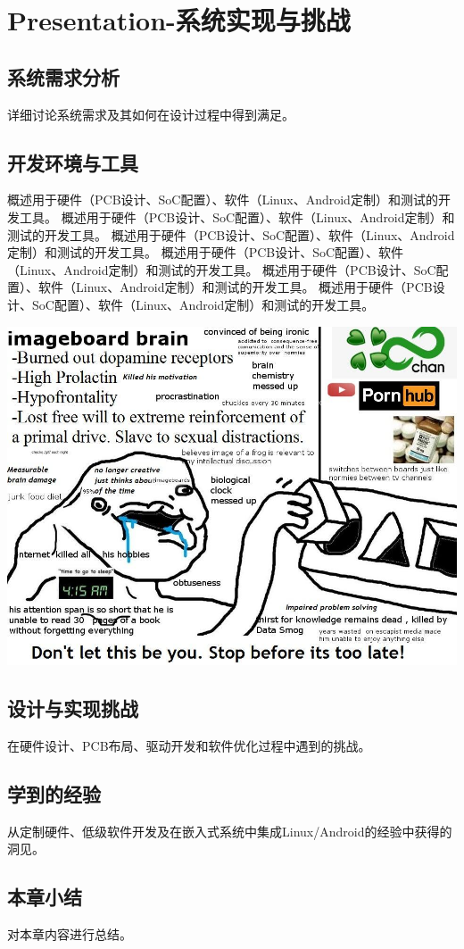 \documentclass[12pt,landscape]{article}
\date{\today}
\title{}
\begin{document}
\tableofcontents

\section{Presentation-系统实现与挑战}
\label{sec:org922999d}
\subsection{系统需求分析}
\label{sec:org104b53e}
详细讨论系统需求及其如何在设计过程中得到满足。
\subsection{开发环境与工具}
\label{sec:orgd7286d9}
概述用于硬件（PCB设计、SoC配置）、软件（Linux、Android定制）和测试的开发工具。
概述用于硬件（PCB设计、SoC配置）、软件（Linux、Android定制）和测试的开发工具。
概述用于硬件（PCB设计、SoC配置）、软件（Linux、Android定制）和测试的开发工具。
概述用于硬件（PCB设计、SoC配置）、软件（Linux、Android定制）和测试的开发工具。
概述用于硬件（PCB设计、SoC配置）、软件（Linux、Android定制）和测试的开发工具。
概述用于硬件（PCB设计、SoC配置）、软件（Linux、Android定制）和测试的开发工具。
\begin{center}
\includegraphics[width=.9\linewidth]{./doom.jpg}
\end{center}
\subsection{设计与实现挑战}
\label{sec:org44ab93f}
在硬件设计、PCB布局、驱动开发和软件优化过程中遇到的挑战。
\subsection{学到的经验}
\label{sec:org3cc03b1}
从定制硬件、低级软件开发及在嵌入式系统中集成Linux/Android的经验中获得的洞见。
\subsection{本章小结}
\label{sec:orgc81f4f7}
对本章内容进行总结。
\end{document}
